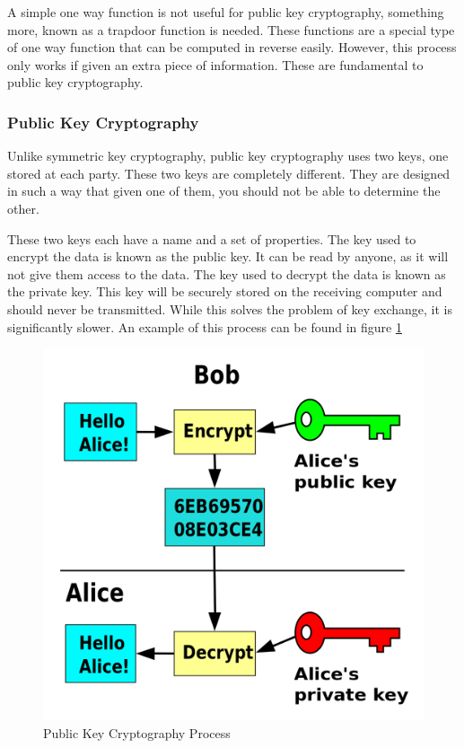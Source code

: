 				A simple one way function is not useful for public key cryptography, 
				something more, known as a trapdoor function is needed. 
				These functions are a special type of one way function that can be computed in reverse easily. 
				However, this process only works if given an extra piece of information. 
				These are fundamental to public key cryptography. 

			\subsubsection{Public Key Cryptography}
				Unlike symmetric key cryptography, public key cryptography uses two keys, one stored at each party. 
				These two keys are completely different. 
				They are designed in such a way that given one of them, you should not be able to determine the other. 

				These two keys each have a name and a set of properties. 
				The key used to encrypt the data is known as the public key. 
				It can be read by anyone, as it will not give them access to the data. 
				The key used to decrypt the data is known as the private key. 
				This key will be securely stored on the receiving computer and should never be transmitted. 
				While this solves the problem of key exchange, it is significantly slower. 
				An example of this process can be found in figure \ref{fig:PublicKey}
				\begin{figure}[htb]
					\centering
					\includegraphics[scale=0.25]{./PublicKey.png}
					\caption{Public Key Cryptography Process}
					\label{fig:PublicKey}
				\end{figure}

